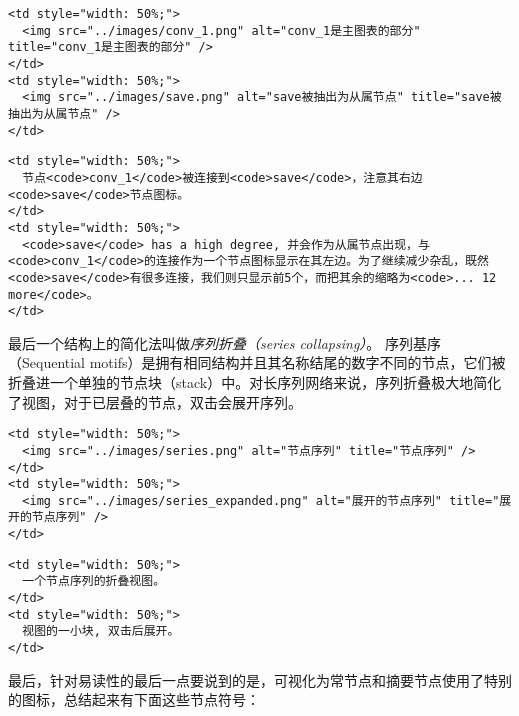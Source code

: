\begin{verbatim}
<td style="width: 50%;">
  <img src="../images/conv_1.png" alt="conv_1是主图表的部分" title="conv_1是主图表的部分" />
</td>
<td style="width: 50%;">
  <img src="../images/save.png" alt="save被抽出为从属节点" title="save被抽出为从属节点" />
</td>
\end{verbatim}

\begin{verbatim}
<td style="width: 50%;">
  节点<code>conv_1</code>被连接到<code>save</code>，注意其右边<code>save</code>节点图标。
</td>
<td style="width: 50%;">
  <code>save</code> has a high degree, 并会作为从属节点出现，与<code>conv_1</code>的连接作为一个节点图标显示在其左边。为了继续减少杂乱，既然<code>save</code>有很多连接，我们则只显示前5个，而把其余的缩略为<code>... 12 more</code>。
</td>
\end{verbatim}

最后一个结构上的简化法叫做\emph{序列折叠（series collapsing）}。
序列基序（Sequential
motifs）是拥有相同结构并且其名称结尾的数字不同的节点，它们被折叠进一个单独的节点块（stack）中。对长序列网络来说，序列折叠极大地简化了视图，对于已层叠的节点，双击会展开序列。

\begin{verbatim}
<td style="width: 50%;">
  <img src="../images/series.png" alt="节点序列" title="节点序列" />
</td>
<td style="width: 50%;">
  <img src="../images/series_expanded.png" alt="展开的节点序列" title="展开的节点序列" />
</td>
\end{verbatim}

\begin{verbatim}
<td style="width: 50%;">
  一个节点序列的折叠视图。
</td>
<td style="width: 50%;">
  视图的一小块, 双击后展开。
</td>
\end{verbatim}

最后，针对易读性的最后一点要说到的是，可视化为常节点和摘要节点使用了特别的图标，总结起来有下面这些节点符号：

